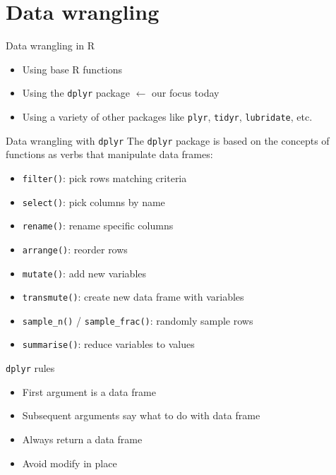 \documentclass[
  ignorenonframetext,
]{beamer}
\providecommand{\tightlist}{%
  \setlength{\itemsep}{0pt}\setlength{\parskip}{0pt}}
\begin{document}
\hypertarget{data-wrangling}{%
\section{Data wrangling}\label{data-wrangling}}

\begin{frame}[fragile]{Data wrangling in R}
\protect\hypertarget{data-wrangling-in-r}{}
\begin{itemize}
\item
  Using base R functions
\item
  Using the \texttt{dplyr} package \(\leftarrow\) our focus today
\item
  Using a variety of other packages like \texttt{plyr}, \texttt{tidyr},
  \texttt{lubridate}, etc.
\end{itemize}
\end{frame}

\begin{frame}[fragile]{Data wrangling with \texttt{dplyr}}
\protect\hypertarget{data-wrangling-with-dplyr}{}
The \texttt{dplyr} package is based on the concepts of functions as
verbs that manipulate data frames:

\begin{itemize}
\tightlist
\item
  \texttt{filter()}: pick rows matching criteria
\item
  \texttt{select()}: pick columns by name
\item
  \texttt{rename()}: rename specific columns
\item
  \texttt{arrange()}: reorder rows
\item
  \texttt{mutate()}: add new variables
\item
  \texttt{transmute()}: create new data frame with variables
\item
  \texttt{sample\_n()} / \texttt{sample\_frac()}: randomly sample rows
\item
  \texttt{summarise()}: reduce variables to values
\end{itemize}
\end{frame}

\begin{frame}{\texttt{dplyr} rules}
\protect\hypertarget{dplyr-rules}{}
\begin{itemize}
\tightlist
\item
  First argument is a data frame
\item
  Subsequent arguments say what to do with data frame
\item
  Always return a data frame
\item
  Avoid modify in place
\end{itemize}
\end{frame}
\end{document}
